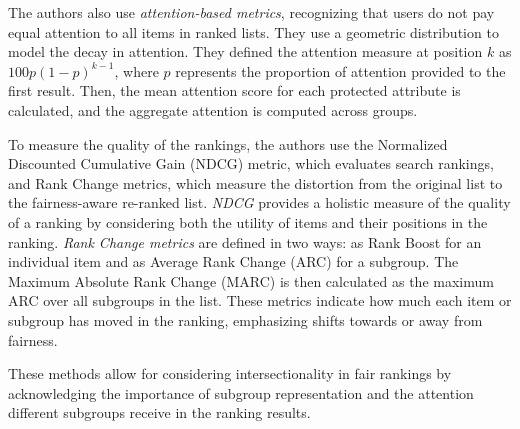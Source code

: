 The authors also use \emph{attention-based metrics}, recognizing that users do not pay equal attention to all items in ranked lists. They use a geometric distribution to model the decay in attention. They defined the attention measure at position $k$ 
as $100p (1-p)^{k-1}$, where
$p$ represents the proportion of attention provided to the first result. Then, the mean attention score for each protected attribute is calculated, and the aggregate attention is computed across groups.


To measure the quality of the rankings, the authors use the Normalized Discounted Cumulative Gain (NDCG) metric, which evaluates search rankings, and Rank Change metrics, which measure the distortion from the original list to the fairness-aware re-ranked list.
% 
\emph{NDCG} provides a holistic measure of the quality of a ranking by considering both the utility of items and their positions in the ranking.
%
\emph{Rank Change metrics} are defined in two ways: as Rank Boost for an individual item and as Average Rank Change (ARC) for a subgroup. The Maximum Absolute Rank Change (MARC) is then calculated as the maximum ARC over all subgroups in the list. These metrics indicate how much each item or subgroup has moved in the ranking, emphasizing shifts towards or away from fairness.

These methods allow for considering intersectionality in fair rankings by acknowledging the importance of subgroup representation and the attention different subgroups receive in the ranking results. 

